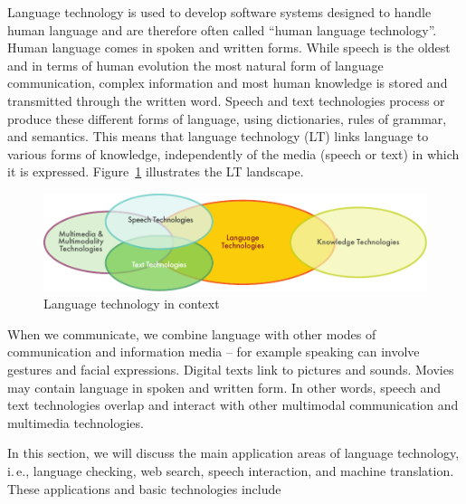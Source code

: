   \clearpage


  \begin{multicols}{2}

  Language technology is used to develop software systems designed to handle human language and are therefore often called “human language technology”. Human language comes in spoken and written forms. While speech is the oldest and in terms of human evolution the most natural form of language communication, complex information and most human knowledge is stored and transmitted through the written word. Speech and text technologies process or produce these different forms of language, using dictionaries, rules of grammar, and semantics. This means that language technology (LT) links language to various forms of knowledge, independently of the media (speech or text) in which it is expressed. Figure~\ref{fig:ltincontext_en} illustrates the LT landscape.

  \begin{figure}[htb]
    \center
    \includegraphics[width=\textwidth]{../_media/english/language_technologies}
    \caption{Language technology in context}
    \label{fig:ltincontext_en}
  \end{figure}

  When we communicate, we combine language with other modes of communication and information media – for example speaking can involve gestures and facial expressions. Digital texts link to pictures and sounds. Movies may contain language in spoken and written form. In other words, speech and text technologies overlap and interact with other multimodal communication and multimedia technologies.

  In this section, we will discuss the main application areas of language technology, i.\,e., language checking, web search, speech interaction, and machine translation. These applications and basic technologies include 


\end{multicols}
